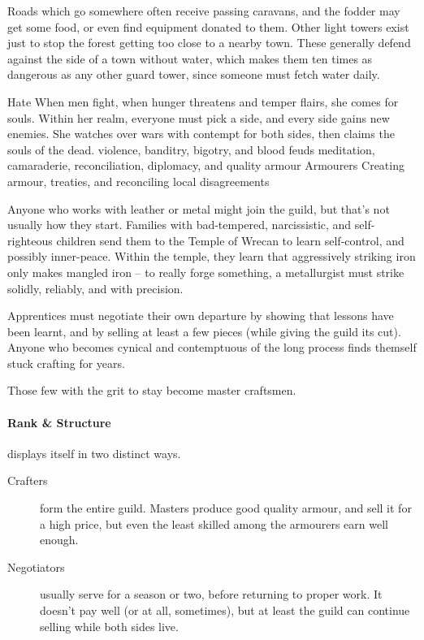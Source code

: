 \begin{multicols}{2}
Roads which go somewhere often receive passing caravans, and the fodder may get some food, or even find equipment donated to them.
Other light towers exist just to stop the forest getting too close to a nearby town.
These generally defend against the side of a town without water, which makes them ten times as dangerous as any other \gls{guard} tower, since someone must fetch water daily.

  {Hate}%
  {When men fight, when hunger threatens and temper flairs, she comes for souls.
  Within her realm, everyone must pick a side, and every side gains new enemies.
  She watches over wars with contempt for both sides, then claims the souls of the dead.}%
  {violence, banditry, bigotry, and blood feuds}%
  {meditation, camaraderie, reconciliation, diplomacy, and quality armour}%
  {Armourers}%
  {Creating armour, treaties, and reconciling local disagreements}%

Anyone who works with leather or metal might join the guild, but that's not usually how they start.
Families with bad-tempered, narcissistic, and self-righteous children send them to the Temple of Wrecan to learn self-control, and possibly inner-peace.
Within the temple, they learn that aggressively striking iron only makes mangled iron -- to really forge something, a metallurgist must strike solidly, reliably, and with precision.

Apprentices must negotiate their own departure by showing that lessons have been learnt, and by selling at least a few pieces (while giving the guild its cut).
Anyone who becomes cynical and contemptuous of the long process finds themself stuck crafting for years.

Those few with the grit to stay become master craftsmen.

\paragraph{Rank \& Structure}
displays itself in two distinct ways.

\begin{description}
  \item[Crafters]
  form the entire guild.
  Masters produce good quality armour, and sell it for a high price, but even the least skilled among the armourers earn well enough.
  \item[Negotiators]
  usually serve for a season or two, before returning to proper work.
  It doesn't pay well (or at all, sometimes), but at least the guild can continue selling while both sides live.


\end{description}
\end{multicols}
